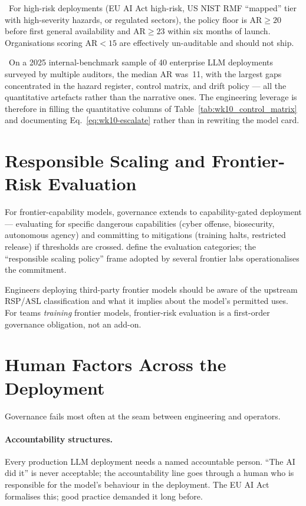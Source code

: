 \Norm\ For high-risk deployments (EU AI Act high-risk,
US NIST RMF ``mapped'' tier with high-severity hazards, or
regulated sectors), the policy floor is $\mathrm{AR} \ge 20$ before
first general availability and $\mathrm{AR} \ge 23$ within six
months of launch. Organisations scoring $\mathrm{AR} < 15$ are
effectively un-auditable and should not ship.

\Find\ On a 2025 internal-benchmark sample of 40 enterprise LLM
deployments surveyed by multiple auditors, the median
$\mathrm{AR}$ was~11, with the largest gaps concentrated in the
hazard register, control matrix, and drift policy --- all the
quantitative artefacts rather than the narrative ones. The
engineering leverage is therefore in filling the
quantitative columns of Table~\ref{tab:wk10_control_matrix} and
documenting Eq.~\eqref{eq:wk10-escalate} rather than in
rewriting the model card.

\section{Responsible Scaling and Frontier-Risk Evaluation}

For frontier-capability models, governance extends to
capability-gated deployment --- evaluating for specific
dangerous capabilities (cyber offense, biosecurity, autonomous
agency) and committing to mitigations (training halts,
restricted release) if thresholds are crossed.
\citet{shevlane2023model} define the evaluation categories; the
``responsible scaling policy'' frame adopted by several frontier
labs operationalises the commitment.

Engineers deploying third-party frontier models should be aware
of the upstream RSP/ASL classification and what it implies about
the model's permitted uses. For teams \emph{training} frontier
models, frontier-risk evaluation is a first-order governance
obligation, not an add-on.

\section{Human Factors Across the Deployment}

Governance fails most often at the seam between engineering
and operators.

\paragraph{Accountability structures.} Every production LLM
deployment needs a named accountable person. ``The AI did it''
is never acceptable; the accountability line goes through a
human who is responsible for the model's behaviour in the
deployment. The EU AI Act formalises this; good practice
demanded it long before.

